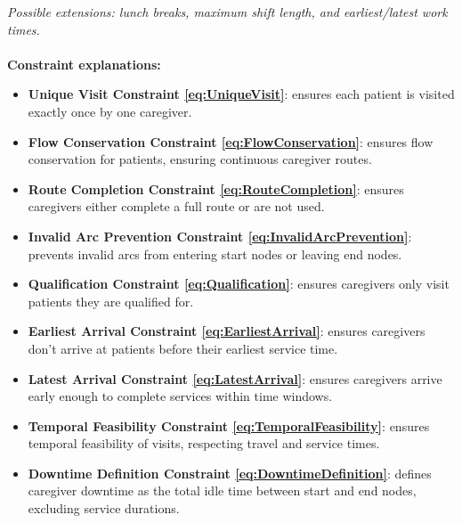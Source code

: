 \documentclass[a4paper]{article}
\begin{document}
\textit{Possible extensions: lunch breaks, maximum shift length, and earliest/latest work times.}
\\\\
\textbf{Constraint explanations:}
\begin{itemize}
\item \textbf{Unique Visit Constraint \eqref{eq:UniqueVisit}}:  ensures each patient is visited exactly once by one caregiver.
\item \textbf{Flow Conservation Constraint \eqref{eq:FlowConservation}}:  ensures flow conservation for patients, ensuring continuous caregiver routes.
\item \textbf{Route Completion Constraint \eqref{eq:RouteCompletion}}:  ensures caregivers either complete a full route or are not used.
\item \textbf{Invalid Arc Prevention Constraint \eqref{eq:InvalidArcPrevention}}:  prevents invalid arcs from entering start nodes or leaving end nodes.
\item \textbf{Qualification Constraint \eqref{eq:Qualification}}:  ensures caregivers only visit patients they are qualified for.
\item \textbf{Earliest Arrival Constraint \eqref{eq:EarliestArrival}}:  ensures caregivers don't arrive at patients before their earliest service time.
\item \textbf{Latest Arrival Constraint \eqref{eq:LatestArrival}}:  ensures caregivers arrive early enough to complete services within time windows.
\item \textbf{Temporal Feasibility Constraint \eqref{eq:TemporalFeasibility}}:  ensures temporal feasibility of visits, respecting travel and service times.
\item \textbf{Downtime Definition Constraint \eqref{eq:DowntimeDefinition}}:  defines caregiver downtime as the total idle time between start and end nodes, excluding service durations.
\end{itemize}
\end{document}
